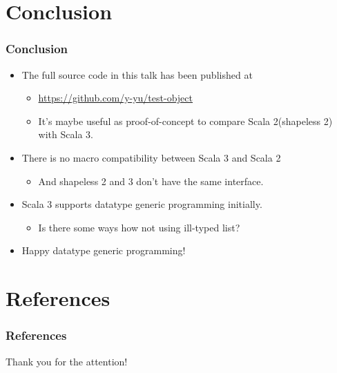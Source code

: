 \section{Conclusion}

\begin{frame}
  \frametitle{Conclusion}

  \pause
  \begin{itemize}
    \item The full source code in this talk has been published at 
    \begin{itemize}
      \item \url{https://github.com/y-yu/test-object}
      \item It's maybe useful as proof-of-concept to compare Scala 2(shapeless 2) with Scala 3.
    \end{itemize}

    \item<+-> There is no macro compatibility between Scala 3 and Scala 2 
    \begin{itemize}
      \item And shapeless 2 and 3 don't have the same interface.
    \end{itemize}

    \item Scala 3 supports datatype generic programming initially.
    \begin{itemize}
      \item Is there some ways how not using ill-typed list?
    \end{itemize}

    \item Happy datatype generic programming!
  \end{itemize}

\end{frame}

\section*{References}
\begin{frame}%
  \frametitle{References}
  
  
\end{frame}

\begin{frame}
  \centering
  {\Huge Thank you for the attention!}
\end{frame}


